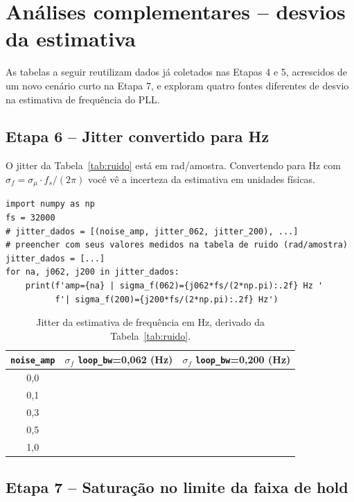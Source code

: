 \documentclass[11pt,a4paper]{article}
\begin{document}
\section{Análises complementares -- desvios da estimativa}

As tabelas a seguir reutilizam dados já coletados nas Etapas 4 e 5,
acrescidos de um novo cenário curto na Etapa 7, e exploram quatro
fontes diferentes de desvio na estimativa de frequência do PLL.

\subsection*{Etapa 6 -- Jitter convertido para Hz}

O jitter da Tabela~\ref{tab:ruido} está em rad/amostra. Convertendo
para Hz com $\sigma_f = \sigma_\mu \cdot f_s/(2\pi)$ você vê a
incerteza da estimativa em unidades físicas.

\begin{instrucao}
\begin{verbatim}
import numpy as np
fs = 32000
# jitter_dados = [(noise_amp, jitter_062, jitter_200), ...]
# preencher com seus valores medidos na tabela de ruido (rad/amostra)
jitter_dados = [...]
for na, j062, j200 in jitter_dados:
    print(f'amp={na} | sigma_f(062)={j062*fs/(2*np.pi):.2f} Hz '
          f'| sigma_f(200)={j200*fs/(2*np.pi):.2f} Hz')
\end{verbatim}
\end{instrucao}

\begin{table}[H]
  \centering
  \begin{tabular}{c c c}
    \toprule
    \texttt{noise\_amp} & $\sigma_f$ \texttt{loop\_bw}=0{,}062 (Hz) & $\sigma_f$ \texttt{loop\_bw}=0{,}200 (Hz) \\
    \midrule
    0{,}0 & & \\
    0{,}1 & & \\
    0{,}3 & & \\
    0{,}5 & & \\
    1{,}0 & & \\
    \bottomrule
  \end{tabular}
  \caption{Jitter da estimativa de frequência em Hz, derivado da Tabela~\ref{tab:ruido}.}
  \label{tab:jitter_hz}
\end{table}

\subsection*{Etapa 7 -- Saturação no limite da faixa de hold}
\end{document}
